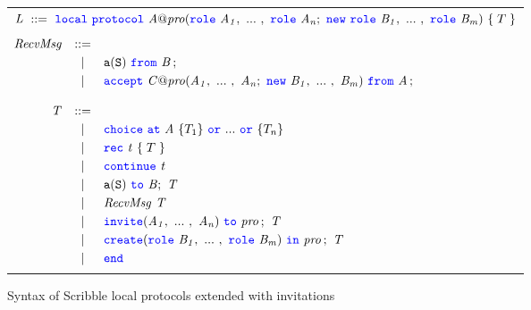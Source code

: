 \documentclass[12pt,twoside]{report}
\begin{document}
\begin{figure}[h!]
    \begin{center}
        \begin{tabular}{l}
            $\mathit{L}\ ::=\ {\color{blue}\mathtt{local}}\ {\color{blue}\mathtt{protocol}}\ \mathit{A@pro}({\color{blue}\mathtt{role}}\ \mathit{A_1},\ ...\ ,\ {\color{blue}\mathtt{role}}\ \mathit{A_n};\ {\color{blue}\mathtt{new}}\ {\color{blue}\mathtt{role}}\ \mathit{B_1},\ ...\ ,\ {\color{blue}\mathtt{role}}\ \mathit{B_m})\ \{\;T\;\}$ \\\\
            \begin{math}
                \begin{array}{@{}rcl}
                    \mathit{RecvMsg} & ::= & \\[2.75pt]
                     & | & \messageFromL{a}{S}{B}\,;\\[2.75pt]
                     & | & \acceptL{C@pro}{A}{B}{A}\,;\\\\
        
                    \mathit{T} & ::= &\\[2.75pt]
                      &   | & \choice\ \at\ \mathit{A}\ \{T_1\}\ \scror\ ...\ \scror\ \{T_n\} \\[2.75pt]
                      &   | & \rec\ \mathit{t}\ \{\;T\;\} \\[2.75pt]
                      &   | &  \continue\ \mathit{t} \\[2.75pt]
                      &   | & \scrmessage{a}{S}\ \scrto\ \mathit{B};\ \mathit{T} \\[2.75pt]
                      &   | & \mathit{RecvMsg}\ \mathit{T}\\[2.75pt]
                      &   | & \invite(\roles{A}{n})\ \scrto\ \mathit{pro}\,;\ \mathit{T} \\[2.75pt]
                      &   | & \create(\rolessig{B}{m})\ \scrin\ \mathit{pro}\,;\ \mathit{T}\\[2.75pt]
                    &   | & \scrend \\[2.75pt]
                \end{array}
            \end{math}
        \end{tabular}
    \end{center}
    \caption{Syntax of Scribble local protocols extended with invitations}
    \label{scr-local-protocols-syntax}
\end{figure}
\end{document}
